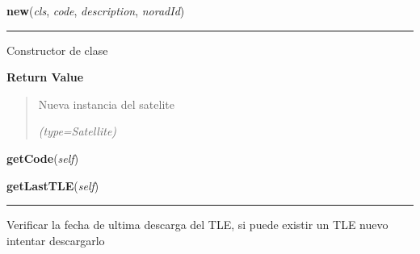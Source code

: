     \label{GroundSegment:models:Satellite:Satellite:new}

    \vspace{0.5ex}

\hspace{.8\funcindent}\begin{boxedminipage}{\funcwidth}

    \raggedright \textbf{new}(\textit{cls}, \textit{code}, \textit{description}, \textit{noradId})

    \vspace{-1.5ex}

    \rule{\textwidth}{0.5\fboxrule}
\setlength{\parskip}{2ex}
    Constructor de clase

\setlength{\parskip}{1ex}
      \textbf{Return Value}
    \vspace{-1ex}

      \begin{quote}
      Nueva instancia del satelite

      {\it (type=Satellite)}

      \end{quote}

    \end{boxedminipage}

    \label{GroundSegment:models:Satellite:Satellite:getCode}

    \vspace{0.5ex}

\hspace{.8\funcindent}\begin{boxedminipage}{\funcwidth}

    \raggedright \textbf{getCode}(\textit{self})

\setlength{\parskip}{2ex}
\setlength{\parskip}{1ex}
    \end{boxedminipage}

    \label{GroundSegment:models:Satellite:Satellite:getLastTLE}

    \vspace{0.5ex}

\hspace{.8\funcindent}\begin{boxedminipage}{\funcwidth}

    \raggedright \textbf{getLastTLE}(\textit{self})

    \vspace{-1.5ex}

    \rule{\textwidth}{0.5\fboxrule}
\setlength{\parskip}{2ex}
    Verificar la fecha de ultima descarga del TLE, si puede existir un TLE 
    nuevo intentar descargarlo

\setlength{\parskip}{1ex}
    \end{boxedminipage}

